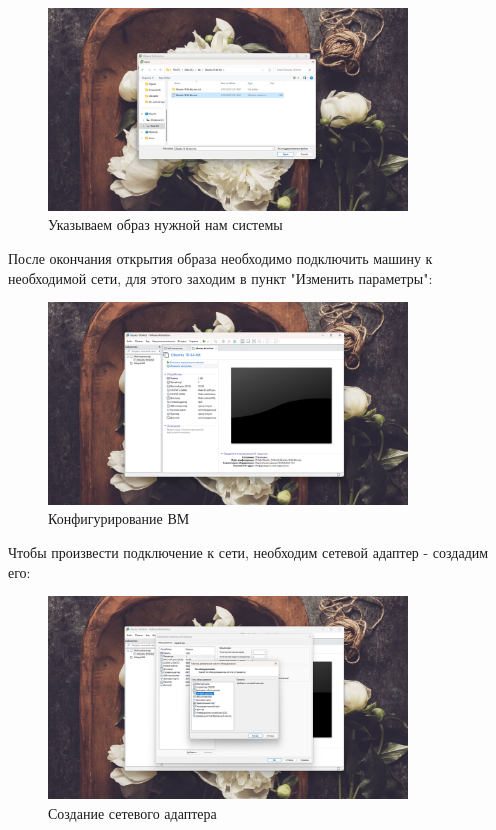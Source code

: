 \documentclass[a4paper]{article}
\begin{document}
  \begin{figure}[H]
    \centering
    \includegraphics[width=0.85\textwidth]{03_00 (8)}
    \caption{Указываем образ нужной нам системы}
    \label{img:8}
  \end{figure}

  После окончания открытия образа необходимо подключить машину к необходимой сети,
  для этого заходим в пункт "Изменить параметры":

  \begin{figure}[H]
    \centering
    \includegraphics[width=0.85\textwidth]{03_00 (9)}
    \caption{Конфигурирование ВМ}
    \label{img:9}
  \end{figure}

  Чтобы произвести подключение к сети, необходим сетевой адаптер - создадим его:

  \begin{figure}[H]
    \centering
    \includegraphics[width=0.85\textwidth]{03_00 (10)}
    \caption{Создание сетевого адаптера}
    \label{img:10}
  \end{figure}
\end{document}
